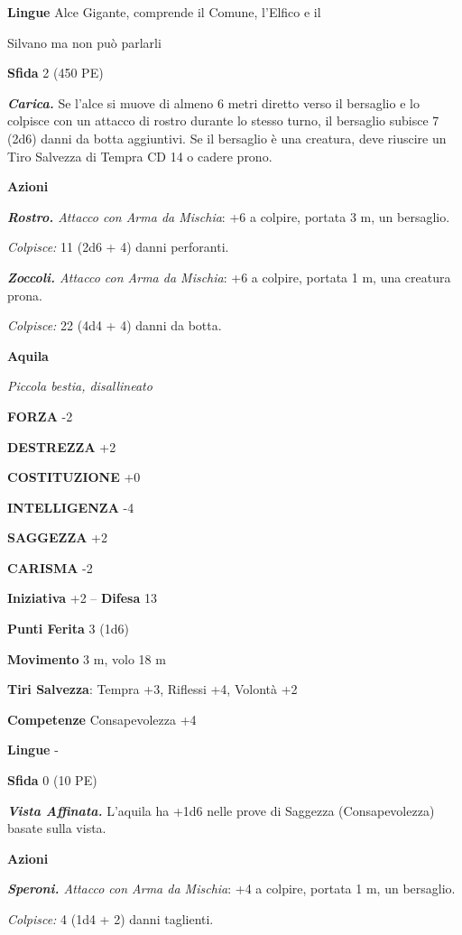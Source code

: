 \begin{multicols}{2}
\textbf{Lingue} Alce Gigante, comprende il Comune, l'Elfico e il

Silvano ma non può parlarli

\textbf{Sfida} 2 (450 PE)

\emph{\textbf{Carica.}} Se l'alce si muove di almeno 6 metri diretto verso il bersaglio e lo colpisce con un attacco di rostro durante lo stesso turno, il bersaglio subisce 7 (2d6) danni da botta aggiuntivi. Se il bersaglio è una creatura, deve riuscire un Tiro Salvezza di Tempra CD 14 o cadere prono.

\textbf{Azioni}

\emph{\textbf{Rostro.} Attacco con Arma da Mischia}: +6 a colpire, portata 3 m, un bersaglio.

\emph{Colpisce:} 11 (2d6 + 4) danni perforanti.

\emph{\textbf{Zoccoli.} Attacco con Arma da Mischia}: +6 a colpire, portata 1 m, una creatura prona.

\emph{Colpisce:} 22 (4d4 + 4) danni da botta.

\medskip\textbf{Aquila}

\emph{Piccola bestia, disallineato}

\textbf{FORZA} -2

\textbf{DESTREZZA} +2

\textbf{COSTITUZIONE} +0

\textbf{INTELLIGENZA} -4

\textbf{SAGGEZZA} +2

\textbf{CARISMA} -2

\textbf{Iniziativa} +2 -- \textbf{Difesa} 13

\textbf{Punti Ferita} 3 (1d6)

\textbf{Movimento} 3 m, volo 18 m

\textbf{Tiri Salvezza}: Tempra +3, Riflessi +4, Volontà +2

\textbf{Competenze} Consapevolezza +4

\textbf{Lingue} -

\textbf{Sfida} 0 (10 PE)

\emph{\textbf{Vista Affinata.}} L'aquila ha +1d6 nelle prove di Saggezza (Consapevolezza) basate sulla vista.

\textbf{Azioni}

\emph{\textbf{Speroni.} Attacco con Arma da Mischia}: +4 a colpire, portata 1 m, un bersaglio.

\emph{Colpisce:} 4 (1d4 + 2) danni taglienti.


\end{multicols}
